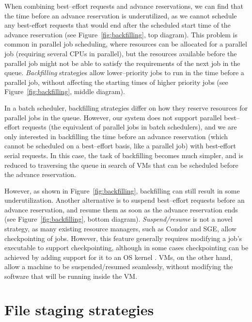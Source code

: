 When combining best--effort requests and advance reservations, we can find that the time before an advance reservation is underutilized, as we cannot schedule any best-effort requests that would end after the scheduled start time of the advance reservation (see Figure~\ref{fig:backfilling}, top diagram). This problem is common in parallel job scheduling, where resources can be allocated for a parallel job (requiring several CPUs in parallel), but the resources available before the parallel job might not be able to satisfy the requirements of the next job in the queue. \emph{Backfilling} strategies \cite{10.1109/ICPPW.2002.1039773,feitelson02analyzing,feitelson04parallel} allow lower--priority jobs to run in the time before a parallel job, without affecting the starting times of higher priority jobs (see Figure~\ref{fig:backfilling}, middle diagram).

In a batch scheduler, backfilling strategies differ on how they reserve resources for parallel jobs in the queue. However, our system does not support parallel best--effort requests (the equivalent of parallel jobs in batch schedulers), and we are only interested in backfilling the time before an advance reservation (which cannot be scheduled on a best--effort basis, like a parallel job) with best-effort serial requests. In this case, the task of backfilling becomes much simpler, and is reduced to traversing the queue in search of VMs that can be scheduled before the advance reservation.

However, as shown in Figure~\ref{fig:backfilling}, backfilling can still result in some underutilization. Another alternative is to suspend best--effort requests before an advance reservation, and resume them as soon as the advance reservation ends (see Figure~\ref{fig:backfilling}, bottom diagram). \emph{Suspend/resume} is not a novel strategy, as many existing resource managers, such as Condor and SGE, allow checkpointing of jobs. However, this feature generally requires modifying a job's executable to support checkpointing, although in some cases checkpointing can be achieved by adding support for it to an OS kernel \cite{blcr}. VMs, on the other hand, allow a machine to be suspended/resumed seamlessly, without modifying the software that will be running inside the VM.


\section{File staging strategies}
\label{sec:filestaging}

